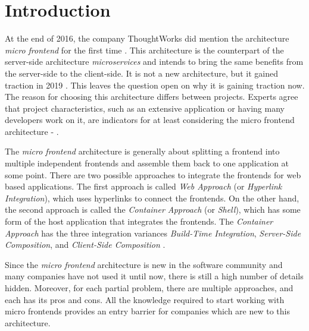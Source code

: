 \chapter{Introduction}\label{cha:introdction}

At the end of 2016, the company ThoughtWorks did mention the architecture \textit{micro frontend} for the first time \cite{ThoughtWorks.2016}.
This architecture is the counterpart of the server-side architecture \textit{microservices} and intends to bring the same benefits from the server-side to the client-side.
It is not a new architecture, but it gained traction in 2019 \cite{Betts.2020}.
This leaves the question open on why it is gaining traction now.
The reason for choosing this architecture differs between projects.
Experts agree that project characteristics, such as an extensive application or having many developers work on it, are indicators for at least considering the micro frontend architecture \cite{Vogel.2020.Olleck} - \cite{Vogel.2020.Rehm}.


The \textit{micro frontend} architecture is generally about splitting a frontend into multiple independent frontends and assemble them back to one application at some point.
There are two possible approaches to integrate the frontends for web based applications.
The first approach is called \textit{Web Approach} (or \textit{Hyperlink Integration}), which uses hyperlinks to connect the frontends.
On the other hand, the second approach is called the \textit{Container Approach} (or \textit{Shell}), which has some form of the host application that integrates the frontends.
The \textit{Container Approach} has the three integration variances \textit{Build-Time Integration}, \textit{Server-Side Composition}, and \textit{Client-Side Composition} \cite[p.~69ff.]{Wenzel.2020} \cite{Leitner.2020}. %


Since the \textit{micro frontend} architecture is new in the software community and many companies have not used it until now, there is still a high number of details hidden.
Moreover, for each partial problem, there are multiple approaches, and each has its pros and cons.
All the knowledge required to start working with micro frontends provides an entry barrier for companies which are new to this architecture.


